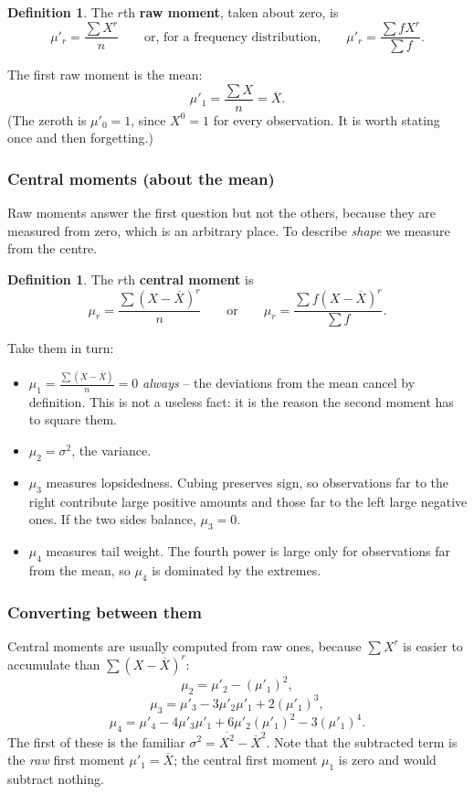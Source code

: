 \documentclass[11pt,a4paper]{article}
\theoremstyle{definition}
\newtheorem{definition}[thm]{Definition}
\begin{document}
\begin{definition}
The $r$th \textbf{raw moment}, taken about zero, is
\[\mu'_r=\frac{\sum X^r}{n}
\qquad\text{or, for a frequency distribution,}\qquad
\mu'_r=\frac{\sum fX^r}{\sum f}.\]
\end{definition}

The first raw moment is the mean:
\[\mu'_1=\frac{\sum X}{n}=\overline{X}.\]
(The zeroth is $\mu'_0=1$, since $X^0=1$ for every observation. It is worth stating once
and then forgetting.)

\subsubsection{Central moments (about the mean)}

Raw moments answer the first question but not the others, because they are measured from
zero, which is an arbitrary place. To describe \emph{shape} we measure from the centre.

\begin{definition}
The $r$th \textbf{central moment} is
\[\mu_r=\frac{\sum (X-\overline{X})^r}{n}
\qquad\text{or}\qquad
\mu_r=\frac{\sum f(X-\overline{X})^r}{\sum f}.\]
\end{definition}

Take them in turn:
\begin{itemize}
\item $\mu_1=\frac{\sum (X-\overline{X})}{n}=0$ \emph{always} -- the deviations from the
mean cancel by definition. This is not a useless fact: it is the reason the second moment
has to square them.
\item $\mu_2=\sigma^2$, the variance.
\item $\mu_3$ measures lopsidedness. Cubing preserves sign, so observations far to the
right contribute large positive amounts and those far to the left large negative ones. If
the two sides balance, $\mu_3=0$.
\item $\mu_4$ measures tail weight. The fourth power is large only for observations far
from the mean, so $\mu_4$ is dominated by the extremes.
\end{itemize}

\subsubsection{Converting between them}

Central moments are usually computed from raw ones, because $\sum X^r$ is easier to
accumulate than $\sum (X-\overline{X})^r$:
\[\mu_2=\mu'_2-\left(\mu'_1\right)^2,\]
\[\mu_3=\mu'_3-3\mu'_2\mu'_1+2\left(\mu'_1\right)^3,\]
\[\mu_4=\mu'_4-4\mu'_3\mu'_1+6\mu'_2\left(\mu'_1\right)^2-3\left(\mu'_1\right)^4.\]
The first of these is the familiar $\sigma^2=\overline{X^2}-\overline{X}^2$. Note that the
subtracted term is the \emph{raw} first moment $\mu'_1=\overline{X}$; the central first
moment $\mu_1$ is zero and would subtract nothing.
\end{document}
